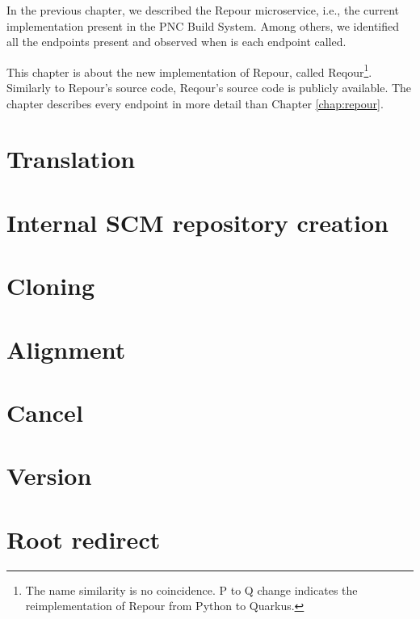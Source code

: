 \documentclass[../../main.tex]{subfiles}
\begin{document}
In the previous chapter, we described the Repour microservice, i.e., the current implementation present in the PNC Build System. Among others, we identified all the endpoints present and observed when is each endpoint called.

This chapter is about the new implementation of Repour, called Reqour\footnote{The name similarity is no coincidence. P to Q change indicates the reimplementation of Repour from Python to Quarkus.}. Similarly to Repour's source code, Reqour's source code is publicly available\cite{reqour}. The chapter describes every endpoint in more detail than Chapter \ref{chap:repour}.

\section{Translation}


\section{Internal SCM repository creation}


\section{Cloning}


\section{Alignment}
\label{section:alignment}


\section{Cancel}


\section{Version}


\section{Root redirect}

\end{document}
